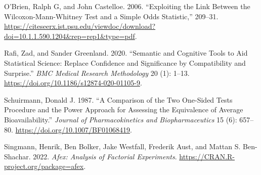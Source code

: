 \documentclass[
]{interact}
\newlength{\cslhangindent}
\newlength{\cslentryspacingunit} %
\newenvironment{CSLReferences}[2] %
 {%
  \setlength{\parindent}{0pt}
  \ifodd #1
  \let\oldpar\par
  \def\par{\hangindent=\cslhangindent\oldpar}
  \fi
  \setlength{\parskip}{#2\cslentryspacingunit}
 }%
 {}
\begin{document}
\begin{CSLReferences}{1}{0}
\leavevmode{}%
O'Brien, Ralph G, and John Castelloe. 2006. {``Exploiting the Link
Between the Wilcoxon-Mann-Whitney Test and a Simple Odds Statistic,''}
209--31.
\url{https://citeseerx.ist.psu.edu/viewdoc/download?doi=10.1.1.590.1204\&rep=rep1\&type=pdf}.

\leavevmode{}%
Rafi, Zad, and Sander Greenland. 2020. {``Semantic and Cognitive Tools
to Aid Statistical Science: Replace Confidence and Significance by
Compatibility and Surprise.''} \emph{BMC Medical Research Methodology}
20 (1): 1--13. \url{https://doi.org/10.1186/s12874-020-01105-9}.

\leavevmode{}%
Schuirmann, Donald J. 1987. {``A Comparison of the Two One-Sided Tests
Procedure and the Power Approach for Assessing the Equivalence of
Average Bioavailability.''} \emph{Journal of Pharmacokinetics and
Biopharmaceutics} 15 (6): 657--80.
\url{https://doi.org/10.1007/BF01068419}.

\leavevmode{}%
Singmann, Henrik, Ben Bolker, Jake Westfall, Frederik Aust, and Mattan
S. Ben-Shachar. 2022. \emph{Afex: Analysis of Factorial Experiments}.
\url{https://CRAN.R-project.org/package=afex}.

\end{CSLReferences}
\end{document}
